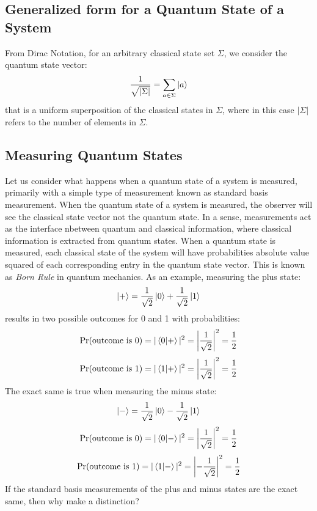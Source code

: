 \documentclass[11pt]{scrartcl}
\begin{document}
\subsection{Generalized form for a Quantum State of a System}
From Dirac Notation, for an arbitrary classical state set $\Sigma$, we consider the quantum state vector:
$$\frac{1}{\sqrt{|\Sigma|}}=\sum_{a\in\Sigma}\ket{a}$$
that is a uniform superposition of the classical states in $\Sigma$, where in this case $|\Sigma|$ refers to the number of elements in $\Sigma$.
\subsection{Measuring Quantum States}
Let us consider what happens when a quantum state of a system is measured, primarily with a simple type of measurement known as standard basis measurement.
When the quantum state of a system is measured, the observer will see the classical state vector not the quantum state. 
In a sense, measurements act as the interface nbetween quantum and classical information, where classical information is extracted from quantum states.
When a quantum state is measured, each classical state of the system will have probabilities absolute value squared of each corresponding
entry in the quantum state vector. This is known as \textit{Born Rule} in quantum mechanics. As an example, measuring the plus state:
$$\ket{+} = \frac{1}{\sqrt{2}}\ket{0} + \frac{1}{\sqrt{2}}\ket{1}$$
results in two possible outcomes for 0 and 1 with probabilities:
\[
\Pr(\text{outcome is } 0) = |\braket{0 | +}|^2 = \left| \frac{1}{\sqrt{2}} \right|^2 = \frac{1}{2}
\]
\[
\Pr(\text{outcome is } 1) = |\braket{1 | +}|^2 = \left| \frac{1}{\sqrt{2}} \right|^2 = \frac{1}{2}
\]
The exact same is true when measuring the minus state:
\[
\ket{-} = \frac{1}{\sqrt{2}} \ket{0} - \frac{1}{\sqrt{2}} \ket{1}
\]
\[
\Pr(\text{outcome is } 0) = |\braket{0 | -}|^2 = \left| \frac{1}{\sqrt{2}} \right|^2 = \frac{1}{2}
\]
\[
\Pr(\text{outcome is } 1) = |\braket{1 | -}|^2 = \left| -\frac{1}{\sqrt{2}} \right|^2 = \frac{1}{2}
\]
If the standard basis measurements of the plus and minus states are the exact same, then why make a distinction?
\end{document}
